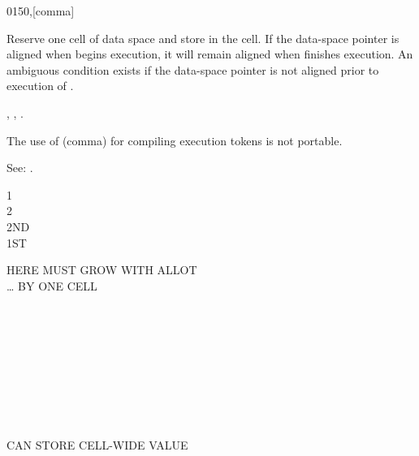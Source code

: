 \vspace*{-2ex}
\begin{worddef}{0150}{,}[comma]
\item {}

	Reserve one cell of data space and store  in the cell.
	If the data-space pointer is aligned when \word{,} begins
	execution, it will remain aligned when \word{,} finishes
	execution. An ambiguous condition exists if the data-space
	pointer is not aligned prior to execution of \word{,}.

\see {},
	,
	.

	\begin{rationale} %
		The use of \word{,} (comma) for compiling execution tokens is
		not portable.

		See: .
	\end{rationale}

	\begin{testing} %
		\ttfamily
		 1 \word{,} \\
		 2 \word{,} \\
		 2ND \\
		 1ST

		  HERE MUST GROW WITH ALLOT \\
		     {\ldots} BY ONE CELL \\
		 \\
		 \\
		 \\
		 \\
		 \\
		 \\
		 \\
		 \\
		 \\
		 \tab {} CAN STORE CELL-WIDE VALUE
	\end{testing}
\end{worddef}

